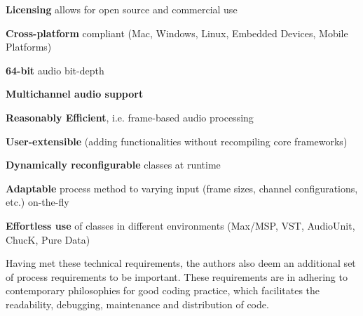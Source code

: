 \documentclass[twoside,10pt]{article}
\newenvironment{packed_item}{
\begin{itemize}
  \setlength{\itemsep}{1pt}
  \setlength{\parskip}{0pt}
  \setlength{\parsep}{0pt}
}{\end{itemize}}
\begin{document}
\begin{packed_item}%
  \item \textbf{Licensing} allows for open source and commercial use
	\item \textbf{Cross-platform} compliant (Mac, Windows, Linux, Embedded Devices, Mobile Platforms)	
	\item \textbf{64-bit} audio bit-depth
	\item \textbf{Multichannel audio support}
	\item \textbf{Reasonably Efficient}, i.e. frame-based audio processing
	\item \textbf{User-extensible} (adding functionalities without recompiling core frameworks)
	\item \textbf{Dynamically reconfigurable} classes at runtime %
	\item \textbf{Adaptable} process method to varying input (frame sizes, channel configurations, etc.) on-the-fly
	\item \textbf{Effortless use} of classes in different environments (Max/MSP, VST, AudioUnit, ChucK, Pure Data)
\end{packed_item}%


\noindent Having met these technical requirements, the authors also deem an additional set of process requirements to be important.  These requirements are in adhering to contemporary philosophies for good coding practice, 
which facilitates the readability, debugging, maintenance and distribution of code. 
\end{document}
